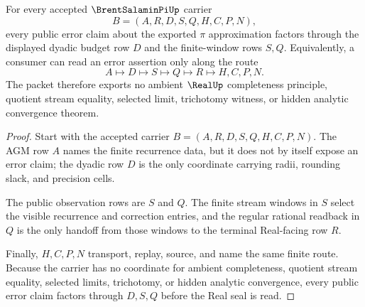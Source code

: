 \begin{theorem}
\label{thm:brent-salamin-pi-dyadic-error-ledger}
For every accepted $\BrentSalaminPiUp$ carrier
$$
B=(A,R,D,S,Q,H,C,P,N),
$$
every public error claim about the exported $\pi$ approximation factors through the displayed dyadic budget row $D$ and the finite-window rows $S,Q$. Equivalently, a consumer can read an error assertion only along the route
$$
A\longmapsto D\longmapsto S\longmapsto Q\longmapsto R\longmapsto H,C,P,N .
$$
The packet therefore exports no ambient $\RealUp$ completeness principle, quotient stream equality, selected limit, trichotomy witness, or hidden analytic convergence theorem.
\end{theorem}
\begin{proof}
Start with the accepted carrier $B=(A,R,D,S,Q,H,C,P,N)$. The AGM row $A$ names the finite recurrence data, but it does not by itself expose an error claim; the dyadic row $D$ is the only coordinate carrying radii, rounding slack, and precision cells.

The public observation rows are $S$ and $Q$. The finite stream windows in $S$ select the visible recurrence and correction entries, and the regular rational readback in $Q$ is the only handoff from those windows to the terminal Real-facing row $R$.

Finally, $H,C,P,N$ transport, replay, source, and name the same finite route. Because the carrier has no coordinate for ambient completeness, quotient stream equality, selected limits, trichotomy, or hidden analytic convergence, every public error claim factors through $D,S,Q$ before the Real seal is read.
\end{proof}




